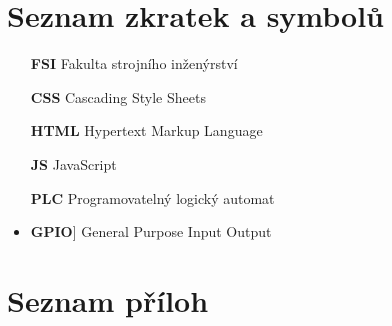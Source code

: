 \chapter*{Seznam zkratek a symbolů}
\label{chap:loa}
\begin{itemize}
    \item[\textbf{FSI}] Fakulta strojního inženýrství

    \item[\textbf{CSS}] Cascading Style Sheets

    \item[\textbf{HTML}] Hypertext Markup Language

    \item[\textbf{JS}] JavaScript

    \item[\textbf{PLC}] Programovatelný logický automat

    \item\textbf{GPIO}] General Purpose Input Output
\end{itemize}

\printbibliography[heading=bibintoc,title={Seznam zdrojů}]

\listoffigures

\listoftables

\chapter*{Seznam příloh}
